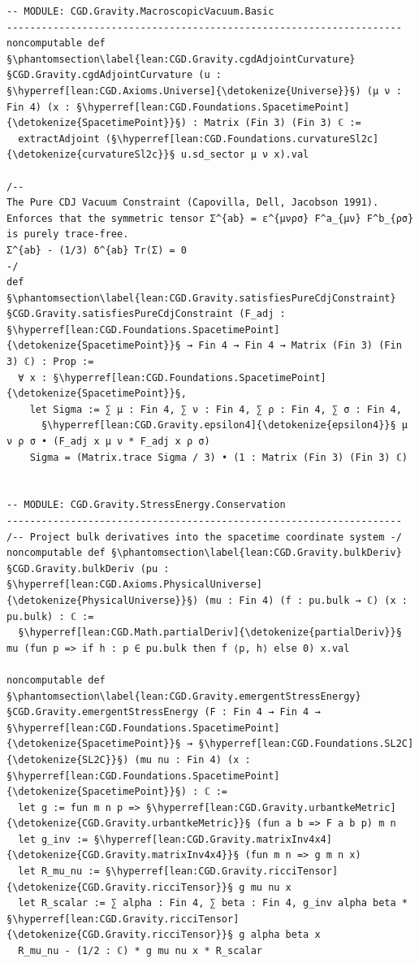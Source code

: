 \begin{verbatim}
-- MODULE: CGD.Gravity.MacroscopicVacuum.Basic
--------------------------------------------------------------------
noncomputable def §\phantomsection\label{lean:CGD.Gravity.cgdAdjointCurvature}§CGD.Gravity.cgdAdjointCurvature (u : §\hyperref[lean:CGD.Axioms.Universe]{\detokenize{Universe}}§) (μ ν : Fin 4) (x : §\hyperref[lean:CGD.Foundations.SpacetimePoint]{\detokenize{SpacetimePoint}}§) : Matrix (Fin 3) (Fin 3) ℂ :=
  extractAdjoint (§\hyperref[lean:CGD.Foundations.curvatureSl2c]{\detokenize{curvatureSl2c}}§ u.sd_sector μ ν x).val

/--
The Pure CDJ Vacuum Constraint (Capovilla, Dell, Jacobson 1991).
Enforces that the symmetric tensor Σ^{ab} = ε^{μνρσ} F^a_{μν} F^b_{ρσ} is purely trace-free.
Σ^{ab} - (1/3) δ^{ab} Tr(Σ) = 0
-/
def §\phantomsection\label{lean:CGD.Gravity.satisfiesPureCdjConstraint}§CGD.Gravity.satisfiesPureCdjConstraint (F_adj : §\hyperref[lean:CGD.Foundations.SpacetimePoint]{\detokenize{SpacetimePoint}}§ → Fin 4 → Fin 4 → Matrix (Fin 3) (Fin 3) ℂ) : Prop :=
  ∀ x : §\hyperref[lean:CGD.Foundations.SpacetimePoint]{\detokenize{SpacetimePoint}}§,
    let Sigma := ∑ μ : Fin 4, ∑ ν : Fin 4, ∑ ρ : Fin 4, ∑ σ : Fin 4,
      §\hyperref[lean:CGD.Gravity.epsilon4]{\detokenize{epsilon4}}§ μ ν ρ σ • (F_adj x μ ν * F_adj x ρ σ)
    Sigma = (Matrix.trace Sigma / 3) • (1 : Matrix (Fin 3) (Fin 3) ℂ)


-- MODULE: CGD.Gravity.StressEnergy.Conservation
--------------------------------------------------------------------
/-- Project bulk derivatives into the spacetime coordinate system -/
noncomputable def §\phantomsection\label{lean:CGD.Gravity.bulkDeriv}§CGD.Gravity.bulkDeriv (pu : §\hyperref[lean:CGD.Axioms.PhysicalUniverse]{\detokenize{PhysicalUniverse}}§) (mu : Fin 4) (f : pu.bulk → ℂ) (x : pu.bulk) : ℂ :=
  §\hyperref[lean:CGD.Math.partialDeriv]{\detokenize{partialDeriv}}§ mu (fun p => if h : p ∈ pu.bulk then f ⟨p, h⟩ else 0) x.val

noncomputable def §\phantomsection\label{lean:CGD.Gravity.emergentStressEnergy}§CGD.Gravity.emergentStressEnergy (F : Fin 4 → Fin 4 → §\hyperref[lean:CGD.Foundations.SpacetimePoint]{\detokenize{SpacetimePoint}}§ → §\hyperref[lean:CGD.Foundations.SL2C]{\detokenize{SL2C}}§) (mu nu : Fin 4) (x : §\hyperref[lean:CGD.Foundations.SpacetimePoint]{\detokenize{SpacetimePoint}}§) : ℂ :=
  let g := fun m n p => §\hyperref[lean:CGD.Gravity.urbantkeMetric]{\detokenize{CGD.Gravity.urbantkeMetric}}§ (fun a b => F a b p) m n
  let g_inv := §\hyperref[lean:CGD.Gravity.matrixInv4x4]{\detokenize{CGD.Gravity.matrixInv4x4}}§ (fun m n => g m n x)
  let R_mu_nu := §\hyperref[lean:CGD.Gravity.ricciTensor]{\detokenize{CGD.Gravity.ricciTensor}}§ g mu nu x
  let R_scalar := ∑ alpha : Fin 4, ∑ beta : Fin 4, g_inv alpha beta * §\hyperref[lean:CGD.Gravity.ricciTensor]{\detokenize{CGD.Gravity.ricciTensor}}§ g alpha beta x
  R_mu_nu - (1/2 : ℂ) * g mu nu x * R_scalar


\end{verbatim}
